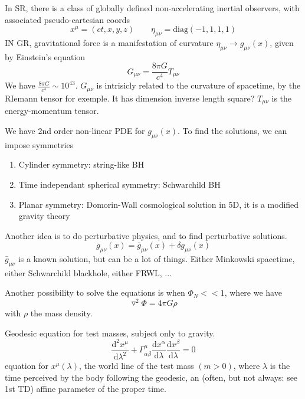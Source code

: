 \documentclass[a4paper]{book}
\theoremstyle{definition}
\theoremstyle{remark}
\begin{document}
In SR, there is a class of globally defined non-accelerating inertial observers, with associated pseudo-cartesian coords 
\begin{equation}
    x^\mu = (ct, x, y, z) \qquad \eta_{\mu\nu} = \text{diag}(-1, 1, 1, 1)
\end{equation}
IN GR, gravitational force is a manifestation of curvature $\eta_{\mu\nu} \rightarrow g_{\mu\nu}(x)$, given by Einstein's equation 
\begin{equation}
    G_{\mu\nu} = \frac{8\pi G}{c^4}T_{\mu\nu}
\end{equation}
We have $\frac{8\pi G}{c^4} \sim 10^{43}$. $G_{\mu\nu}$ is intrisicly related to the curvature of spacetime, by the RIemann tensor for exemple. It has dimension inverse length square? $T_{\mu\nu}$ is the energy-momentum tensor. \par \medskip 

We have 2nd order non-linear PDE for $g_{\mu\nu}(x)$. To find the solutions, we can impose symmetries 

\begin{enumerate}
    \item Cylinder symmetry: string-like BH
    \item Time independant spherical symmetry: Schwarchild BH 
    \item Planar symmetry: Domorin-Wall cosmological solution in 5D, it is a modified gravity theory
\end{enumerate}

Another idea is to do perturbative physics, and to find perturbative solutions. 
\begin{equation}
    g_{\mu\nu}(x) = \bar{g}_{\mu\nu}(x) + \delta g_{\mu\nu}(x)
\end{equation}
$\bar{g}_{\mu\nu}$ is a known solution, but can be a lot of things. Either Minkowski spacetime, either Schwarchild blackhole, either FRWL, ... \par \medskip 

Another possibility to solve the equations is when $\Phi_N << 1$, where we have 
\begin{equation}
    \triangledown ^2 \Phi = 4\pi G\rho  
\end{equation}
with $\rho$ the mass density. \par \medskip 

Geodesic equation for test masses, subject only to gravity. 
\begin{equation}
    \frac{\text{d}^2x^\mu}{\text{d}\lambda^2} + \Gamma^\mu_{\alpha\beta} \frac{\text{d}x^\alpha}{\text{d}\lambda} \frac{\text{d} x^\beta}{\text{d}\lambda} = 0
\end{equation}
equation for $x^\mu(\lambda)$, the world line of the test mass $(m>0)$, where $\lambda$ is the time perceived by the body following the geodesic, an (often, but not always: see 1st TD) affine parameter of the proper time. \par \medskip 
\end{document}
